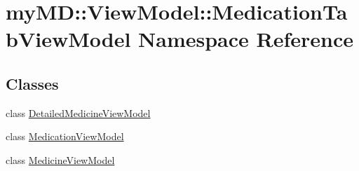 \hypertarget{namespacemy_m_d_1_1_view_model_1_1_medication_tab_view_model}{
\section{my\-MD::View\-Model::Medication\-Tab\-View\-Model Namespace Reference}
\label{d1/dbe/namespacemy_m_d_1_1_view_model_1_1_medication_tab_view_model}
}


\subsection*{Classes}
\begin{CompactItemize}
\item 
class \hyperlink{classmy_m_d_1_1_view_model_1_1_medication_tab_view_model_1_1_detailed_medicine_view_model}{Detailed\-Medicine\-View\-Model}
\item 
class \hyperlink{classmy_m_d_1_1_view_model_1_1_medication_tab_view_model_1_1_medication_view_model}{Medication\-View\-Model}
\item 
class \hyperlink{classmy_m_d_1_1_view_model_1_1_medication_tab_view_model_1_1_medicine_view_model}{Medicine\-View\-Model}
\end{CompactItemize}
